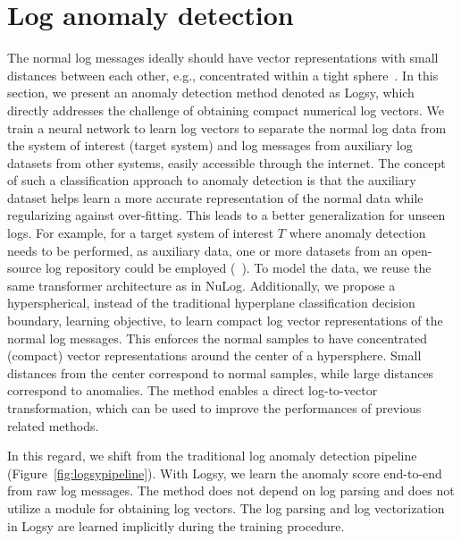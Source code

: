 \section{Log anomaly detection}
The normal log messages ideally should have vector representations with small distances between each other, e.g., concentrated within a tight sphere~\cite{ruff2019deep}. In this section, we present an anomaly detection method denoted as Logsy, which directly addresses the challenge of obtaining compact numerical log vectors. We train a neural network to learn log vectors to separate the normal log data from the system of interest (target system) and log messages from auxiliary log datasets from other systems, easily accessible through the internet. The concept of such a classification approach to anomaly detection is that the auxiliary dataset helps learn a more accurate representation of the normal data while regularizing against over-fitting. This leads to a better generalization for unseen logs. For example, for a target system of interest $T$ where anomaly detection needs to be performed, as auxiliary data, one or more datasets from an open-source log repository could be employed (~\cite{oliner2007supercomputers}). To model the data, we reuse the same transformer architecture as in NuLog. Additionally, we propose a hyperspherical, instead of the traditional hyperplane classification decision boundary, learning objective, to learn compact log vector representations of the normal log messages. This enforces the normal samples to have concentrated (compact) vector representations around the center of a hypersphere. Small distances from the center correspond to normal samples, while large distances correspond to anomalies. The method enables a direct log-to-vector transformation, which can be used to improve the performances of previous related methods.

In this regard, we shift from the traditional log anomaly detection pipeline (Figure~\ref{fig:logsypipeline}). With Logsy, we learn the anomaly score end-to-end from raw log messages. The method does not depend on log parsing and does not utilize a module for obtaining log vectors. The log parsing and log vectorization in Logsy are learned implicitly during the training procedure. 



